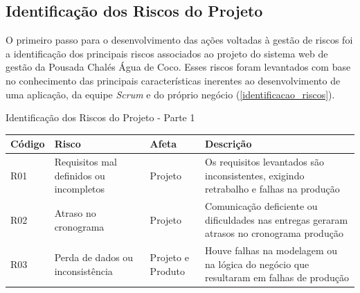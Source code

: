 \documentclass[
	12pt,				%
	openany,			%
	twoside,			%
	a4paper,			%
	english,			%
	french,				%
	spanish,			%
	brazil				%
	]{abntex2}
\begin{document}
\subsection{Identificação dos Riscos do Projeto}
O primeiro passo para o desenvolvimento das ações voltadas à gestão de riscos foi a identificação dos principais riscos associados ao projeto do sistema web de gestão da Pousada Chalés Água de Coco. Esses riscos foram levantados com base no conhecimento das principais características inerentes ao desenvolvimento de uma aplicação, da equipe \textit{Scrum} e do próprio negócio (\autoref{identificacao_riscos}).
\begin{quadro}[H]
	\caption{Identificação dos Riscos do Projeto - Parte 1} \label{identificacao_riscos_1} 
	\begin{tabular}{|p{2.8cm}|p{5cm}|p{3cm}|p{4.2cm}|}
	\hline
	\textbf{Código} & \textbf{Risco} & \textbf{Afeta} & \textbf{Descrição}  \\
	\hline
			R01 & Requisitos mal definidos ou incompletos &
			Projeto  & Os requisitos levantados são inconsistentes, exigindo retrabalho e falhas na produção \\
		\hline
			R02 & Atraso no cronograma &
			Projeto  & Comunicação deficiente ou dificuldades nas entregas geraram atrasos no cronograma produção \\
		\hline
			R03 & Perda de dados ou inconsistência &
			Projeto e Produto  & Houve falhas na modelagem ou na lógica do negócio que resultaram em falhas de produção \\ \hline
\end{tabular}
\end{quadro}		
			
\end{document}

